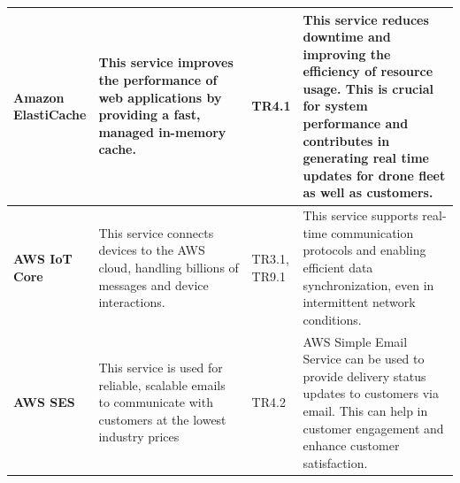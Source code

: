 \documentclass{article}
\begin{document}
\begin{table}[H]
\begin{tabular}{|p{0.1\linewidth}| p{0.4\linewidth} | p{0.1\linewidth} | p{0.4\linewidth} |}
    \textbf{Amazon ElastiCache \cite{elcache}}&  This service improves the performance of web applications by providing a fast, managed in-memory cache.& TR4.1 & This service reduces downtime and improving the efficiency of resource usage. This is crucial for system performance and contributes in generating real time updates for drone fleet as well as customers. \\ \hline 
    
     \textbf{AWS IoT Core \cite{iot}}&  This service connects devices to the AWS cloud, handling billions of messages and device interactions.& TR3.1, TR9.1 & This service supports real-time communication protocols and enabling efficient data synchronization, even in intermittent network conditions.\\ \hline 

     \textbf{AWS SES \cite{ses}}&  This service is used for reliable, scalable emails to communicate with customers at the lowest industry prices & TR4.2 & AWS Simple Email Service can be used to provide delivery status updates to customers via email. This can help in customer engagement and enhance customer satisfaction. 
    
    \\ \hline 
    \end{tabular}
\end{table}
\end{document}
